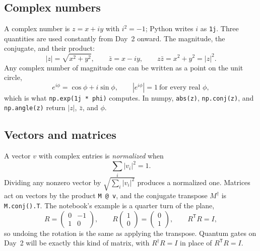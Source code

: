 \documentclass[11pt]{article}
\newcommand{\code}[1]{\texttt{#1}}
\begin{document}
\subsection{Complex numbers}

A complex number is $z = x + iy$ with $i^2 = -1$; Python writes $i$ as \code{1j}. Three quantities are used constantly from Day~2 onward. The magnitude, the conjugate, and their product:
\begin{equation}
|z| = \sqrt{x^2 + y^2}, \qquad \bar z = x - iy, \qquad z\bar z = x^2 + y^2 = |z|^2 .
\end{equation}
Any complex number of magnitude one can be written as a point on the unit circle,
\begin{equation}
e^{i\phi} = \cos\phi + i\sin\phi, \qquad |e^{i\phi}| = 1 \ \text{for every real } \phi,
\end{equation}
which is what \code{np.exp(1j * phi)} computes. In numpy, \code{abs(z)}, \code{np.conj(z)}, and \code{np.angle(z)} return $|z|$, $\bar z$, and $\phi$.

\subsection{Vectors and matrices}

A vector $v$ with complex entries is \emph{normalized} when
\begin{equation}
\sum_i |v_i|^2 = 1 .
\label{eq:norm}
\end{equation}
Dividing any nonzero vector by $\sqrt{\sum_i |v_i|^2}$ produces a normalized one. Matrices act on vectors by the product \code{M @ v}, and the conjugate transpose $M^\dagger$ is \code{M.conj().T}. The notebook's example is a quarter turn of the plane,
\begin{equation}
R = \begin{pmatrix} 0 & -1 \\ 1 & 0 \end{pmatrix}, \qquad
R \begin{pmatrix} 1 \\ 0 \end{pmatrix} = \begin{pmatrix} 0 \\ 1 \end{pmatrix}, \qquad
R^{\mathsf T} R = I ,
\end{equation}
so undoing the rotation is the same as applying the transpose. Quantum gates on Day~2 will be exactly this kind of matrix, with $R^\dagger R = I$ in place of $R^{\mathsf T} R = I$.
\end{document}
